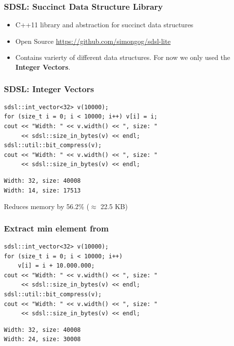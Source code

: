 \documentclass{beamer}
\begin{document}
\begin{frame}
    \frametitle{SDSL: Succinct Data Structure Library}

    \begin{itemize}
        \item C++11 library and abstraction for succinct data structures
        \item Open Source \url{https://github.com/simongog/sdsl-lite}
        \item Contains varierty of different data structures. For now we only used the \textbf{Integer Vectors}.
    \end{itemize}
\end{frame}


\begin{frame}[fragile]
    \frametitle{SDSL: Integer Vectors}

\begin{lstlisting}[style=C++]
sdsl::int_vector<32> v(10000);
for (size_t i = 0; i < 10000; i++) v[i] = i;
cout << "Width: " << v.width() << ", size: " 
     << sdsl::size_in_bytes(v) << endl;
sdsl::util::bit_compress(v);
cout << "Width: " << v.width() << ", size: " 
     << sdsl::size_in_bytes(v) << endl;
\end{lstlisting}

\pause

\begin{lstlisting}[style=shell]
Width: 32, size: 40008
Width: 14, size: 17513
\end{lstlisting}

\pause

\begin{center}
    Reduces memory by 56.2\% ($\approx$ 22.5 KB)
\end{center}
\end{frame}


\begin{frame}[fragile]
    \frametitle{Extract min element from }

\begin{lstlisting}[style=C++]
sdsl::int_vector<32> v(10000);
for (size_t i = 0; i < 10000; i++) 
    v[i] = i + 10.000.000;
cout << "Width: " << v.width() << ", size: " 
     << sdsl::size_in_bytes(v) << endl;
sdsl::util::bit_compress(v);
cout << "Width: " << v.width() << ", size: " 
     << sdsl::size_in_bytes(v) << endl;
\end{lstlisting}

\begin{lstlisting}[style=shell]
Width: 32, size: 40008
Width: 24, size: 30008
\end{lstlisting}
\end{frame}
\end{document}
